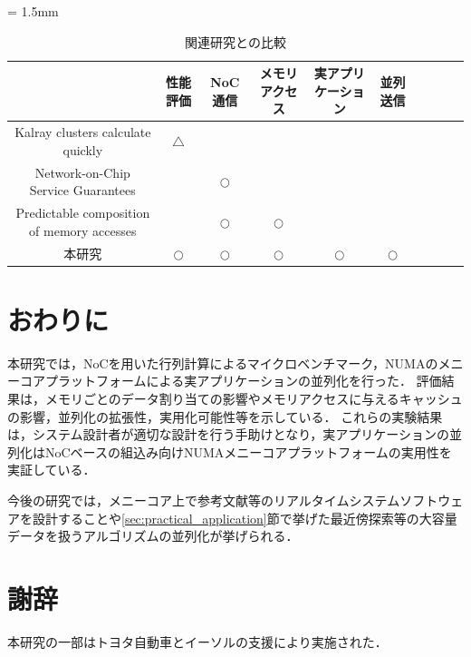 \documentclass[submit,techrep]{ipsj_v2/UTF8/ipsj}
\begin{document}
\begin{table}[t]
  \caption{\label{tb:comparison_relatedwork}
    関連研究との比較}
  \centering
  \scriptsize	                    %
  \tabcolsep = 1.5mm              %
  \begin{tabular}{c|ccccccccc}
    \hline
    & 性能評価 & NoC通信 & メモリアクセス & 実アプリケーション & 並列送信 & \\
    \hline
    \hline
    Kalray clusters calculate quickly \cite{kanter2015kalray} & \(\triangle\) &  &  &  &  & \\
    Network-on-Chip Service Guarantees \cite{denet2017work} &  & \(\bigcirc\) &  &  &  & \\
    Predictable composition of memory accesses \cite{perret2016predictable} &  & \(\bigcirc\) & \(\bigcirc\) &  &  & \\
    本研究 & \(\bigcirc\) & \(\bigcirc\) & \(\bigcirc\) & \(\bigcirc\) & \(\bigcirc\) & \\
    \hline
  \end{tabular}
\end{table}

\section{おわりに}
\label{sec:conclusion}
本研究では，NoCを用いた行列計算によるマイクロベンチマーク，NUMAのメニーコアプラットフォームによる実アプリケーションの並列化を行った．
評価結果は，メモリごとのデータ割り当ての影響やメモリアクセスに与えるキャッシュの影響，並列化の拡張性，実用化可能性等を示している．
これらの実験結果は，システム設計者が適切な設計を行う手助けとなり，実アプリケーションの並列化はNoCベースの組込み向けNUMAメニーコアプラットフォームの実用性を実証している．

今後の研究では，メニーコア上で参考文献\cite{maruyama2016ros2}等のリアルタイムシステムソフトウェアを設計することや\ref{sec:practical_application}節で挙げた最近傍探索等の大容量データを扱うアルゴリズムの並列化が挙げられる．

\section*{謝辞}
本研究の一部はトヨタ自動車とイーソルの支援により実施された．
\vspace{-2mm}



\end{document}
